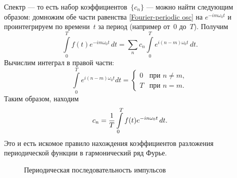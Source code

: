 Спектр --- то есть набор коэффициентов~$\{c_n\}$ ---
можно найти следующим образом: домножим обе части равенства
\eqref{Fourier-periodic osc} на $e^{-im\omega_0 t}$ и
проинтегрируем по времени~$t$ за период (например от~$0$ до~$T$). Получим
\begin{equation*}
    \int\limits_{0}^{T} f(t)e^{-im\omega_0t}\,dt=\sum_n c_n\int\limits_{0}^{T}
e^{i(n-m)\omega_0 t}\,dt.
\end{equation*}
Вычислим интеграл в правой части:
\begin{equation*}
    \int\limits_{0}^{T}e^{i(n-m)\omega_0 t}dt =
    \begin{cases}
        0 & \text{при~}n\ne m,\\
        T & \text{при~}n = m.
    \end{cases}
\end{equation*}
Таким образом, находим
\begin{equation}
    \eqmark{fourier-coeff}
    c_n=\frac{1}{T}\int\limits_{0}^{T} f(t)e^{-in\omega_0 t}\,dt.
\end{equation}
Это и есть искомое правило нахождения коэффициентов разложения периодической
функции в гармонический ряд Фурье.

\begin{wrapfigure}[10]{o}{0.5\textwidth}
    \centering
    \caption{Периодическая последовательность импульсов}
\end{wrapfigure}

